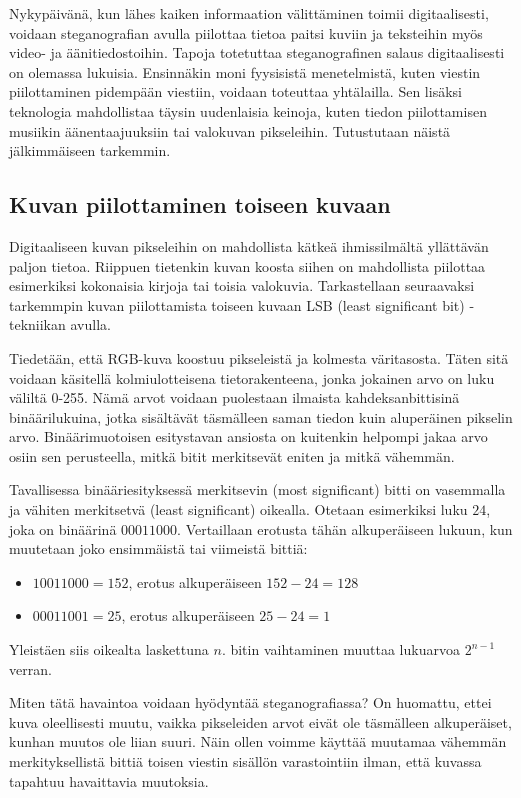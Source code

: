 \documentclass[a4paper,11pt]{article}
\begin{document}
Nykypäivänä, kun lähes kaiken informaation välittäminen toimii digitaalisesti, voidaan steganografian avulla piilottaa tietoa paitsi kuviin ja teksteihin myös video- ja äänitiedostoihin. Tapoja totetuttaa steganografinen salaus digitaalisesti on olemassa lukuisia. Ensinnäkin moni fyysisistä menetelmistä, kuten viestin piilottaminen pidempään viestiin, voidaan toteuttaa yhtälailla. Sen lisäksi teknologia mahdollistaa täysin uudenlaisia keinoja, kuten tiedon piilottamisen musiikin äänentaajuuksiin tai valokuvan pikseleihin. Tutustutaan näistä jälkimmäiseen tarkemmin.

\subsection{Kuvan piilottaminen toiseen kuvaan}
\label{teoria}

Digitaaliseen kuvan pikseleihin on mahdollista kätkeä ihmissilmältä yllättävän paljon tietoa. Riippuen tietenkin kuvan koosta siihen on mahdollista piilottaa esimerkiksi kokonaisia kirjoja tai toisia valokuvia. Tarkastellaan seuraavaksi tarkemmpin kuvan piilottamista toiseen kuvaan LSB (least significant bit) -tekniikan avulla.

Tiedetään, että RGB-kuva koostuu pikseleistä ja kolmesta väritasosta. Täten sitä voidaan käsitellä kolmiulotteisena tietorakenteena, jonka jokainen arvo on luku väliltä 0-255. Nämä arvot voidaan puolestaan ilmaista kahdeksanbittisinä binäärilukuina, jotka sisältävät täsmälleen saman tiedon kuin aluperäinen pikselin arvo. Binäärimuotoisen esitystavan ansiosta on kuitenkin helpompi jakaa arvo osiin sen perusteella, mitkä bitit merkitsevät eniten ja mitkä vähemmän.

Tavallisessa binääriesityksessä merkitsevin (most significant) bitti on vasemmalla ja vähiten merkitsetvä (least significant) oikealla. Otetaan esimerkiksi luku $24$, joka on binäärinä $00011000$. Vertaillaan erotusta tähän alkuperäiseen lukuun, kun muutetaan joko ensimmäistä tai viimeistä bittiä:
\begin{itemize}
    \item $10011000=152$, erotus alkuperäiseen $152-24=128$
    \item $00011001=25$, erotus alkuperäiseen $25-24=1$
\end{itemize}
Yleistäen siis oikealta laskettuna $n$. bitin vaihtaminen muuttaa lukuarvoa $2^{n-1}$ verran.

Miten tätä havaintoa voidaan hyödyntää steganografiassa? On huomattu, ettei kuva oleellisesti muutu, vaikka pikseleiden arvot eivät ole täsmälleen alkuperäiset, kunhan muutos ole liian suuri. Näin ollen voimme käyttää muutamaa vähemmän merkityksellistä bittiä toisen viestin sisällön varastointiin ilman, että kuvassa tapahtuu havaittavia muutoksia.
\end{document}
